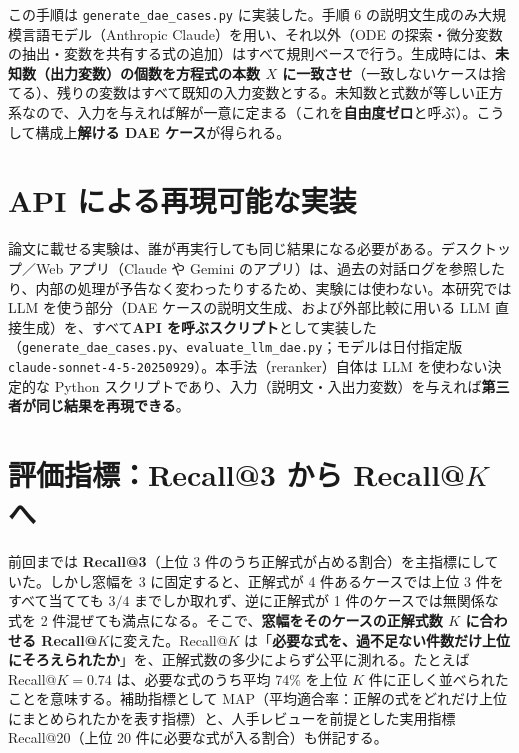 \documentclass[a4j,dvipdfmx,12pt]{jresume}
\begin{document}
この手順は \texttt{generate\_dae\_cases.py} に実装した。手順 6 の説明文生成のみ大規模言語モデル（Anthropic Claude）を用い、それ以外（ODE の探索・微分変数の抽出・変数を共有する式の追加）はすべて規則ベースで行う。生成時には、\textbf{未知数（出力変数）の個数を方程式の本数 $X$ に一致させ}（一致しないケースは捨てる）、残りの変数はすべて既知の入力変数とする。未知数と式数が等しい正方系なので、入力を与えれば解が一意に定まる（これを\textbf{自由度ゼロ}と呼ぶ）。こうして構成上\textbf{解ける DAE ケース}が得られる。

\section{API による再現可能な実装}\label{sec:api}
論文に載せる実験は、誰が再実行しても同じ結果になる必要がある。デスクトップ／Web アプリ（Claude や Gemini のアプリ）は、過去の対話ログを参照したり、内部の処理が予告なく変わったりするため、実験には使わない。本研究では LLM を使う部分（DAE ケースの説明文生成、および外部比較に用いる LLM 直接生成）を、すべて\textbf{API を呼ぶスクリプト}として実装した（\texttt{generate\_dae\_cases.py}、\texttt{evaluate\_llm\_dae.py}；モデルは日付指定版 \texttt{claude-sonnet-4-5-20250929}）。本手法（reranker）自体は LLM を使わない決定的な Python スクリプトであり、入力（説明文・入出力変数）を与えれば\textbf{第三者が同じ結果を再現できる}。

\section{評価指標：Recall@3 から Recall@$K$ へ}\label{sec:metric}
前回までは \textbf{Recall@3}（上位 3 件のうち正解式が占める割合）を主指標にしていた。しかし窓幅を 3 に固定すると、正解式が 4 件あるケースでは上位 3 件をすべて当てても $3/4$ までしか取れず、逆に正解式が 1 件のケースでは無関係な式を 2 件混ぜても満点になる。そこで、\textbf{窓幅をそのケースの正解式数 $K$ に合わせる Recall@$K$}に変えた。Recall@$K$ は「\textbf{必要な式を、過不足ない件数だけ上位にそろえられたか}」を、正解式数の多少によらず公平に測れる。たとえば Recall@$K=0.74$ は、必要な式のうち平均 74\% を上位 $K$ 件に正しく並べられたことを意味する。補助指標として MAP（平均適合率：正解の式をどれだけ上位にまとめられたかを表す指標）と、人手レビューを前提とした実用指標 Recall@20（上位 20 件に必要な式が入る割合）も併記する。
\end{document}
